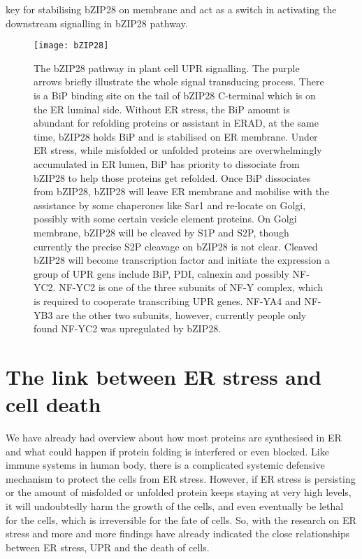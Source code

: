 key for stabilising bZIP28 on membrane and act as a switch in activating the downstream signalling in bZIP28 pathway.
\begin{figure}
	\centering
	\texttt{[image: bZIP28]}
	\caption[Mode of bZIP28 signalling pathway in plant cell UPR.]
	{The bZIP28 pathway in plant cell UPR signalling. The purple arrows briefly illustrate the whole signal transducing process. There is a BiP binding site on the tail of bZIP28 C-terminal which is on the ER luminal side. Without ER stress, the BiP amount is abundant for refolding proteins or assistant in ERAD, at the same time, bZIP28 holds BiP and is stabilised on ER membrane. Under ER stress, while misfolded or unfolded proteins are overwhelmingly accumulated in ER lumen, BiP has priority to dissociate from bZIP28 to help those proteins get refolded. Once BiP dissociates from bZIP28, bZIP28 will leave ER membrane and mobilise with the assistance by some chaperones like Sar1 and re-locate on Golgi, possibly with some certain vesicle element proteins. On Golgi membrane, bZIP28 will be cleaved by S1P and S2P, though currently the precise S2P cleavage on bZIP28 is not clear. Cleaved bZIP28 will become transcription factor and initiate the expression a group of UPR gens include BiP, PDI, calnexin and possibly NF-YC2. NF-YC2 is one of the three subunits of NF-Y complex, which is required to cooperate transcribing UPR genes. NF-YA4 and NF-YB3 are the other two subunits, however, currently people only found NF-YC2 was upregulated by bZIP28.}
	\label{fig:bZIP28_intro}
\end{figure}
\section{The link between ER stress and cell death}
We have already had overview about how most proteins are synthesised in ER and what could happen if protein folding is interfered or even blocked. Like immune systems in human body, there is a complicated systemic defensive mechanism to protect the cells from ER stress. However, if ER stress is persisting or the amount of misfolded or unfolded protein keeps staying at very high levels, it will undoubtedly harm the growth of the cells, and even eventually be lethal for the cells, which is irreversible for the fate of cells. So, with the research on ER stress and more and more findings have already indicated the close relationships between ER stress, UPR and the death of cells.
